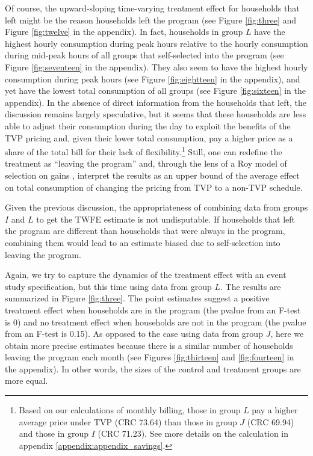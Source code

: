 \documentclass[12pt]{article}
\begin{document}
Of course, the upward-sloping time-varying treatment effect for households that left might be the reason households left the program (see Figure \ref{fig:three} and Figure \ref{fig:twelve} in the appendix). In fact, households in group $L$ have the highest hourly consumption during peak hours relative to the hourly consumption during mid-peak hours of all groups that self-selected into the program (see Figure \ref{fig:seventeen} in the appendix). They also seem to have the highest hourly consumption during peak hours (see Figure \ref{fig:eightteen} in the appendix), and yet have the lowest total consumption of all groups (see Figure \ref{fig:sixteen} in the appendix). In the absence of direct information from the households that left, the discussion remains largely speculative, but it seems that these households are less able to adjust their consumption during the day to exploit the benefits of the TVP pricing and, given their lower total consumption, pay a higher price as a share of the total bill for their lack of flexibility.\footnote{Based on our calculations of monthly billing, those in group $L$ pay a higher average price under TVP (CRC 73.64) than those in group $J$ (CRC 69.94) and those in group $I$ (CRC 71.23). See more details on the calculation in appendix \ref{appendix:appendix_savings}.} Still, one can redefine the treatment as \enquote{leaving the program} and, through the lens of a Roy model of selection on gains \citep{heckmanChapter70Econometric2007}, interpret the results as an upper bound of the average effect on total consumption of changing the pricing from TVP to a non-TVP schedule.

Given the previous discussion, the appropriateness of combining data from groups  $I$ and $L$ to get the TWFE estimate is not undisputable. If households that left the program are different than households that were always in the program, combining them would lead to an estimate biased due to self-selection into leaving the program.

Again, we try to capture the dynamics of the treatment effect with an event study specification, but this time using data from group $L$. The results are summarized in Figure \ref{fig:three}. The point estimates suggest a positive treatment effect when households are in the program (the pvalue from an F-test is 0) and no treatment effect when households are not in the program (the pvalue from an F-test is 0.15). As opposed to the case using data from group  $J$, here we obtain more precise estimates because there is a similar number of households leaving the program each month (see Figures \ref{fig:thirteen} and \ref{fig:fourteen} in the appendix). In other words, the sizes of the control and treatment groups are more equal.
\end{document}
